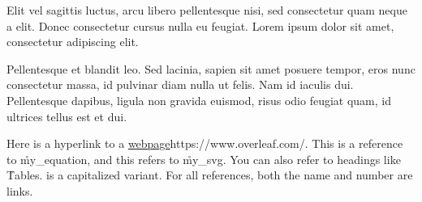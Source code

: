 \documentclass{textbook}
\begin{document}
Elit vel sagittis luctus, arcu libero pellentesque nisi, sed consectetur quam neque a elit. Donec consectetur cursus nulla eu feugiat. Lorem ipsum dolor sit amet, consectetur adipiscing elit.


Pellentesque et blandit leo. Sed lacinia, sapien sit amet posuere tempor, eros nunc consectetur massa, id pulvinar diam nulla ut felis. Nam id iaculis dui. Pellentesque dapibus, ligula non gravida euismod, risus odio feugiat quam, id ultrices tellus est et dui.

Here is a hyperlink to a \url{webpage}{https://www.overleaf.com/}. This is a reference to \r{my_equation}, and this refers to \r{my_svg}. You can also refer to headings like \r{Tables}.  is a capitalized variant. For all references, both the name and number are links.
\end{document}
